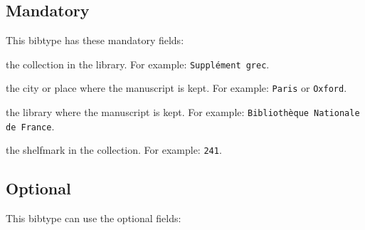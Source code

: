 \documentclass{ltxdockit}[2011/03/25]
\begin{document}
\subsection{Mandatory}
This bibtype has these mandatory fields:

\begin{fieldlist}

 the collection in the library. For example: \verb+Supplément grec+.

 the city or place where the manuscript is kept. For example: \verb+Paris+ or \verb+Oxford+.

 the library where the manuscript is kept. For example: \verb+Bibliothèque Nationale de France+.


 the shelfmark in the collection. For example: \verb+241+.
\end{fieldlist}

\subsection{Optional}
This bibtype can use the optional fields:
\end{document}
